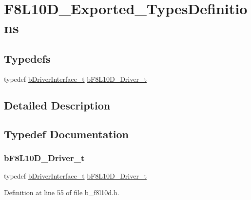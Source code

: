 \hypertarget{group___f8_l10_d___exported___types_definitions}{}\section{F8\+L10\+D\+\_\+\+Exported\+\_\+\+Types\+Definitions}
\label{group___f8_l10_d___exported___types_definitions}
\subsection*{Typedefs}
\begin{DoxyCompactItemize}
\item 
typedef \mbox{\hyperlink{structb_driver_interface__t}{b\+Driver\+Interface\+\_\+t}} \mbox{\hyperlink{group___f8_l10_d___exported___types_definitions_ga8c86a10e36d7c236670aabfbd89c06dd}{b\+F8\+L10\+D\+\_\+\+Driver\+\_\+t}}
\end{DoxyCompactItemize}


\subsection{Detailed Description}


\subsection{Typedef Documentation}
\mbox{\label{group___f8_l10_d___exported___types_definitions_ga8c86a10e36d7c236670aabfbd89c06dd}} 
\subsubsection{\texorpdfstring{b\+F8\+L10\+D\+\_\+\+Driver\+\_\+t}{bF8L10D\_Driver\_t}}
{\footnotesize\ttfamily typedef \mbox{\hyperlink{structb_driver_interface__t}{b\+Driver\+Interface\+\_\+t}} \mbox{\hyperlink{group___f8_l10_d___exported___types_definitions_ga8c86a10e36d7c236670aabfbd89c06dd}{b\+F8\+L10\+D\+\_\+\+Driver\+\_\+t}}}



Definition at line 55 of file b\+\_\+f8l10d.\+h.

